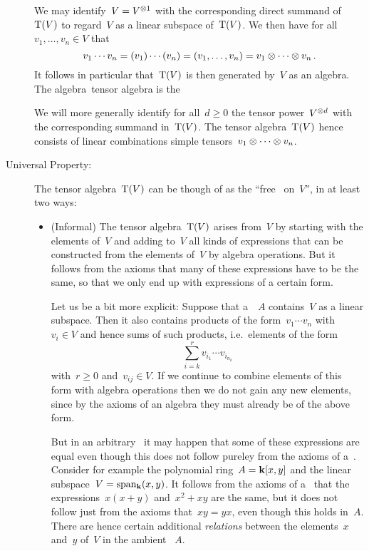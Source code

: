 \begin{recall}
\begin{description}
      We may identify~$V = V^{\otimes 1}$ with the corresponding direct summand of~$\operatorname{T}(V)$ to regard~$V$ as a linear subspace of~$\operatorname{T}(V)$.
      We then have for all~$v_1, \dotsc, v_n \in V$ that
      \[
        v_1 \dotsm v_n
        =
        (v_1) \dotsm (v_n)
        =
        (v_1, \dotsc, v_n)
        =
        v_1 \otimes \dotsb \otimes v_n  \,.
      \]
      It follows in particular that~$\operatorname{T}(V)$ is then generated by~$V$ as an algebra.
      The algebra~\gls*{tensor algebra} is the 
      
      We will more generally identify for all~$d \geq 0$ the tensor power~$V^{\otimes d}$ with the corresponding summand in~$\operatorname{T}(V)$.
      The tensor algebra~$\operatorname{T}(V)$ hence consists of linear combinations simple tensors~$v_1 \otimes \dotsb \otimes v_n$.
    
    \item[Universal Property:]
      The tensor algebra~$\operatorname{T}(V)$ can be though of as the \enquote{free~{\algebra{$\kf$}} on~$V$}, in at least two ways:
      \begin{itemize}
        \item(Informal)
          The tensor algebra~$\operatorname{T}(V)$ arises from~$V$ by starting with the elements of~$V$ and adding to~$V$ all kinds of expressions that can be constructed from the elements of~$V$ by algebra operations.
          But it follows from the axioms that many of these expressions have to be the same, so that we only end up with expressions of a certain form.
          
          Let us be a bit more explicit:
          Suppose that a~{\algebra{$\kf$}}~$A$ contains~$V$ as a linear subspace.
          Then it also contains products of the form~$v_1 \dotsm v_n$ with~$v_i \in V$ and hence sums of such products, i.e.\ elements of the form
          \[
            \sum_{i=k}^r v_{i_1} \dotsm v_{i_{n_k}}
          \]
          with~$r \geq 0$ and~$v_{ij} \in V$.
          If we continue to combine elements of this form with algebra operations then we do not gain any new elements, since by the axioms of an algebra they must already be of the above form.
          
          But in an arbitrary~{\algebra{$\kf$}} it may happen that some of these expressions are equal even though this does not follow pureley from the axioms of a~{\algebra{$\kf$}}.
          Consider for example the polynomial ring~$A = \mathbf{k}[x, y]$ and the linear subspace~$V = {\operatorname{span}}{}_{\mathbf{k}}(x, y)$.
          It follows from the axioms of a~{\algebra{$\kf$}} that the expressions~$x (x+y)$ and~$x^2 + xy$ are the same, but it does not follow just from the axioms that~$xy = yx$, even though this holds in~$A$.
          There are hence certain additional \emph{relations} between the elements~$x$ and~$y$ of~$V$ in the ambient {\algebra{$\kf$}}~$A$.
          

\end{itemize}
\end{description}
\end{recall}
